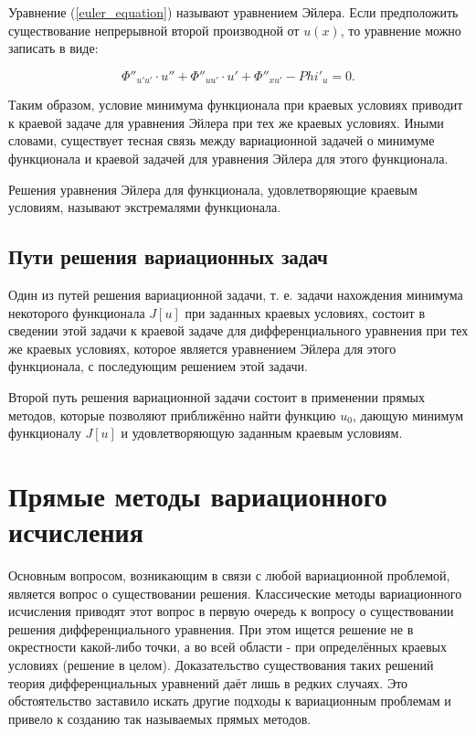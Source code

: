 \documentclass{article}
\begin{document}
\noindent Уравнение (\ref{euler_equation}) называют уравнением Эйлера. Если предположить существование непрерывной второй производной от $u(x)$, то уравнение можно записать в виде:

\begin{equation}
	\Phi''_{u'u'} \cdot u'' + \Phi''_{uu'} \cdot u' + \Phi''_{xu'} - Phi'_{u} = 0.
\end{equation}

Таким образом, условие минимума функционала при краевых условиях приводит к краевой задаче для уравнения Эйлера при тех же краевых условиях. Иными словами, существует тесная связь между вариационной задачей о минимуме функционала и краевой задачей для уравнения Эйлера для этого функционала.

\begin{warn}[Важно!]
	Решения уравнения Эйлера для функционала, удовлетворяющие краевым условиям, называют экстремалями функционала.
\end{warn}

\subsection{Пути решения вариационных задач}

Один из путей решения вариационной задачи, т. е. задачи нахождения минимума некоторого функционала $J[u]$ при заданных краевых условиях, состоит в сведении этой задачи к краевой задаче для дифференциального уравнения при тех же краевых условиях, которое является уравнением Эйлера для этого функционала, с последующим решением этой задачи.

Второй путь решения вариационной задачи состоит в применении прямых методов, которые позволяют приближённо найти функцию $u_{0}$, дающую минимум функционалу $J[u]$ и удовлетворяющую заданным краевым условиям.


\section{Прямые методы вариационного исчисления}

Основным вопросом, возникающим в связи с любой вариационной проблемой, является вопрос о существовании решения. Классические методы вариационного исчисления приводят этот вопрос в первую очередь к вопросу о существовании решения дифференциального уравнения. При этом ищется решение не в окрестности какой-либо точки, а во всей области - при определённых краевых условиях (решение в целом). Доказательство существования таких решений теория дифференциальных уравнений даёт лишь в редких случаях. Это обстоятельство заставило искать другие подходы к вариационным проблемам и привело к созданию так называемых прямых методов.
\end{document}
